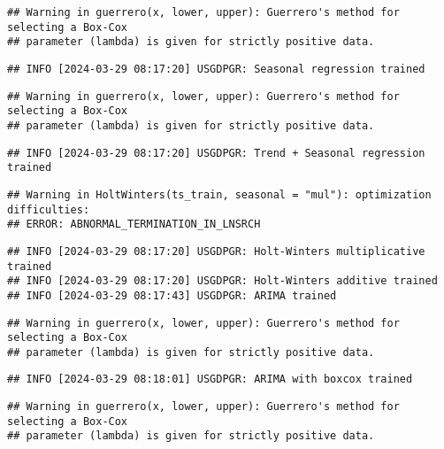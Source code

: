 \documentclass[
]{article}
\begin{document}
\begin{verbatim}
## Warning in guerrero(x, lower, upper): Guerrero's method for selecting a Box-Cox
## parameter (lambda) is given for strictly positive data.
\end{verbatim}

\begin{verbatim}
## INFO [2024-03-29 08:17:20] USGDPGR: Seasonal regression trained
\end{verbatim}

\begin{verbatim}
## Warning in guerrero(x, lower, upper): Guerrero's method for selecting a Box-Cox
## parameter (lambda) is given for strictly positive data.
\end{verbatim}

\begin{verbatim}
## INFO [2024-03-29 08:17:20] USGDPGR: Trend + Seasonal regression trained
\end{verbatim}

\begin{verbatim}
## Warning in HoltWinters(ts_train, seasonal = "mul"): optimization difficulties:
## ERROR: ABNORMAL_TERMINATION_IN_LNSRCH
\end{verbatim}

\begin{verbatim}
## INFO [2024-03-29 08:17:20] USGDPGR: Holt-Winters multiplicative trained
## INFO [2024-03-29 08:17:20] USGDPGR: Holt-Winters additive trained
## INFO [2024-03-29 08:17:43] USGDPGR: ARIMA trained
\end{verbatim}

\begin{verbatim}
## Warning in guerrero(x, lower, upper): Guerrero's method for selecting a Box-Cox
## parameter (lambda) is given for strictly positive data.
\end{verbatim}

\begin{verbatim}
## INFO [2024-03-29 08:18:01] USGDPGR: ARIMA with boxcox trained
\end{verbatim}

\begin{verbatim}
## Warning in guerrero(x, lower, upper): Guerrero's method for selecting a Box-Cox
## parameter (lambda) is given for strictly positive data.
\end{verbatim}
\end{document}
